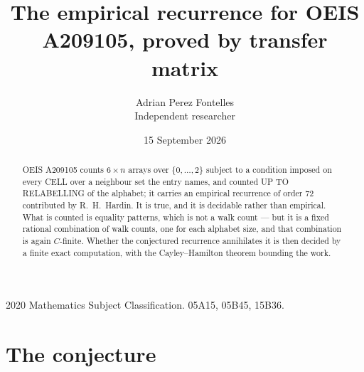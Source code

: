 \documentclass[11pt,a4paper]{article}
\title{The empirical recurrence for OEIS A209105, proved by transfer matrix}
\author{Adrian Perez Fontelles\\ \small Independent researcher}
\date{15 September 2026}
\theoremstyle{plain}
\theoremstyle{definition}
\begin{document}
\maketitle

\begin{abstract}
OEIS A209105 counts $6\times n$ arrays over $\{0,\dots,2\}$ subject to a condition imposed on
every CELL over a neighbour set the entry names, and counted UP TO RELABELLING of the
alphabet; it carries an empirical recurrence of order $72$ contributed by
R.~H.~Hardin. It is true, and it is decidable rather than empirical. What is counted is
equality patterns, which is not a walk count --- but it is a fixed rational combination of
walk counts, one for each alphabet size, and that combination is again $C$-finite. Whether the
conjectured recurrence annihilates it is then decided by a finite exact computation, with the
Cayley--Hamilton theorem bounding the work.
\end{abstract}

\noindent\small 2020 Mathematics Subject Classification. 05A15, 05B45, 15B36.\normalsize

\section{The conjecture}
\end{document}
